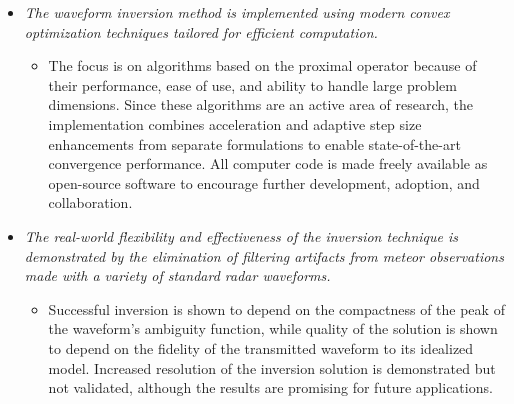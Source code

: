 \begin{itemize}
\begin{itemize}[]
 \end{itemize}
 \item \emph{The waveform inversion method is implemented using modern convex optimization techniques tailored for efficient computation.}
 \begin{itemize}[]
  \item The focus is on algorithms based on the proximal operator because of their performance, ease of use, and ability to handle large problem dimensions. Since these algorithms are an active area of research, the implementation combines acceleration and adaptive step size enhancements from separate formulations to enable state-of-the-art convergence performance. All computer code is made freely available as open-source software to encourage further development, adoption, and collaboration.
 \end{itemize}
 \item \emph{The real-world flexibility and effectiveness of the inversion technique is demonstrated by the elimination of filtering artifacts from meteor observations made with a variety of standard radar waveforms.}
 \begin{itemize}[]
  \item Successful inversion is shown to depend on the compactness of the peak of the waveform's ambiguity function, while quality of the solution is shown to depend on the fidelity of the transmitted waveform to its idealized model. Increased resolution of the inversion solution is demonstrated but not validated, although the results are promising for future applications.
 \end{itemize}
\end{itemize}

